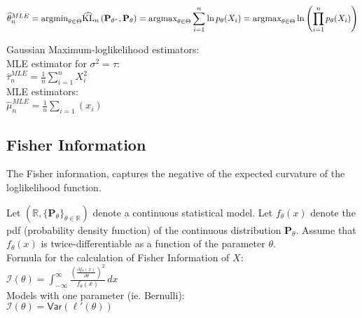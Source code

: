 $\widehat{\theta }_ n^{MLE} =\\ \displaystyle \text {argmin}_{\theta \in \Theta }\widehat{\text {KL}}_ n\left(\mathbf{P}_{\theta ^*}, \mathbf{P}_{\theta }\right) =\\ \displaystyle \text {argmax}_{\theta \in \Theta } \sum _{i=1}^{n} \ln p_{\theta }(X_ i) =\\  \displaystyle \text {argmax}_{\theta \in \Theta } \ln \left(\prod _{i=1}^{n} p_{\theta }(X_ i)\right)$

Gaussian Maximum-loglikelihood estimators:\\

 MLE estimator for $\sigma^2 = \tau$:\\  
$\hat{\tau }_ n^{MLE} = \frac{1}{n} \sum _{i = 1}^ n X_ i^2$\\

MLE estimators:\\

$\hat{\mu}_ n^{MLE}=\frac{1}{n}\sum_{i=1}(x_i)$


\subsection{Fisher Information}

The Fisher information, captures the negative of the expected curvature of the loglikelihood function.

Let $(\mathbb {R}, \{ \mathbf{P}_\theta \} _{\theta \in \mathbb {R}})$ denote a continuous statistical model. Let $f_\theta (x)$ denote the pdf (probability density function) of the continuous distribution $\mathbf{P}_\theta$. Assume that $f_\theta (x)$ is twice-differentiable as a function of the parameter $\theta$.\\

Formula for the calculation of Fisher Information of $X$:\\

$\displaystyle  \mathcal{I}(\theta )= \int _{-\infty }^\infty \frac{\left(\frac{\partial f_\theta (x)}{\partial \theta }\right)^2}{f_\theta (x)} \,  dx$ \\

Models with one parameter (ie. Bernulli):\\

$\mathcal{I}(\theta ) = \textsf{Var}(\ell '(\theta ))$\\

